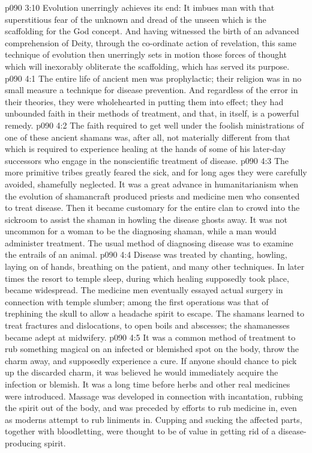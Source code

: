 \vs p090 3:10 \pc Evolution unerringly achieves its end: It imbues man with that superstitious fear of the unknown and dread of the unseen which is the scaffolding for the God concept. And having witnessed the birth of an advanced comprehension of Deity, through the co\hyp{}ordinate action of revelation, this same technique of evolution then unerringly sets in motion those forces of thought which will inexorably obliterate the scaffolding, which has served its purpose.
\vs p090 4:1 The entire life of ancient men was prophylactic; their religion was in no small measure a technique for disease prevention. And regardless of the error in their theories, they were wholehearted in putting them into effect; they had unbounded faith in their methods of treatment, and that, in itself, is a powerful remedy.
\vs p090 4:2 \pc The faith required to get well under the foolish ministrations of one of these ancient shamans was, after all, not materially different from that which is required to experience healing at the hands of some of his later\hyp{}day successors who engage in the nonscientific treatment of disease.
\vs p090 4:3 \pc The more primitive tribes greatly feared the sick, and for long ages they were carefully avoided, shamefully neglected. It was a great advance in humanitarianism when the evolution of shamancraft produced priests and medicine men who consented to treat disease. Then it became customary for the entire clan to crowd into the sickroom to assist the shaman in howling the disease ghosts away. It was not uncommon for a woman to be the diagnosing shaman, while a man would administer treatment. The usual method of diagnosing disease was to examine the entrails of an animal.
\vs p090 4:4 Disease was treated by chanting, howling, laying on of hands, breathing on the patient, and many other techniques. In later times the resort to temple sleep, during which healing supposedly took place, became widespread. The medicine men eventually essayed actual surgery in connection with temple slumber; among the first operations was that of trephining the skull to allow a headache spirit to escape. The shamans learned to treat fractures and dislocations, to open boils and abscesses; the shamanesses became adept at midwifery.
\vs p090 4:5 It was a common method of treatment to rub something magical on an infected or blemished spot on the body, throw the charm away, and supposedly experience a cure. If anyone should chance to pick up the discarded charm, it was believed he would immediately acquire the infection or blemish. It was a long time before herbs and other real medicines were introduced. Massage was developed in connection with incantation, rubbing the spirit out of the body, and was preceded by efforts to rub medicine in, even as moderns attempt to rub liniments in. Cupping and sucking the affected parts, together with bloodletting, were thought to be of value in getting rid of a disease\hyp{}producing spirit.
